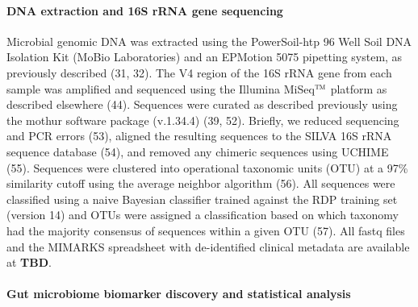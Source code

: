 \documentclass[11pt,]{article}
\let\oldparagraph\paragraph
\renewcommand{\paragraph}[1]{\oldparagraph{#1}\mbox{}}
\begin{document}
\paragraph{DNA extraction and 16S rRNA gene
sequencing}\label{dna-extraction-and-16s-rrna-gene-sequencing}

Microbial genomic DNA was extracted using the PowerSoil-htp 96 Well Soil
DNA Isolation Kit (MoBio Laboratories) and an EPMotion 5075 pipetting
system, as previously described (31, 32). The V4 region of the 16S rRNA
gene from each sample was amplified and sequenced using the Illumina
MiSeq\(\text{\texttrademark}\) platform as described elsewhere (44).
Sequences were curated as described previously using the mothur software
package (v.1.34.4) (39, 52). Briefly, we reduced sequencing and PCR
errors (53), aligned the resulting sequences to the SILVA 16S rRNA
sequence database (54), and removed any chimeric sequences using UCHIME
(55). Sequences were clustered into operational taxonomic units (OTU) at
a 97\% similarity cutoff using the average neighbor algorithm (56). All
sequences were classified using a naive Bayesian classifier trained
against the RDP training set (version 14) and OTUs were assigned a
classification based on which taxonomy had the majority consensus of
sequences within a given OTU (57). All fastq files and the MIMARKS
spreadsheet with de-identified clinical metadata are available at
\textbf{TBD}.

\paragraph{Gut microbiome biomarker discovery and statistical
analysis}\label{gut-microbiome-biomarker-discovery-and-statistical-analysis}
\end{document}
